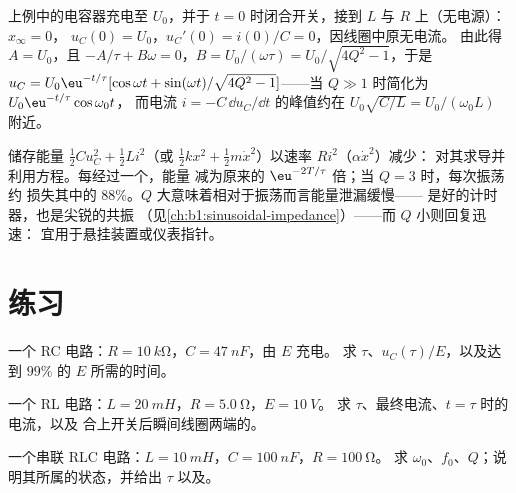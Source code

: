 \begin{example}[初始条件]\label{ex:b1:transient-regimes:ic}
上例中的电容器充电至 $U_0$，并于
$t = 0$ 时闭合开关，接到 $L$ 与 $R$ 上（无电源）：$x_\infty = 0$，
$u_C(0) = U_0$，$u_C'(0) = i(0)/C = 0$，因线圈中原无电流。
由此得 $A = U_0$，且 $-A/\tau + B\omega = 0$，$B = U_0/(\omega\tau) =
U_0/\sqrt{4Q^2 - 1}$，于是 $u_C = U_0\eu^{-t/\tau}[\cos\omega t + \sin(\omega
t)/\sqrt{4Q^2 - 1}]$——当 $Q \gg 1$ 时简化为 $U_0\eu^{-t/\tau}\cos\omega_0 t$，
而电流 $i = -C\,\dd u_C/\dd t$ 的峰值约在 $U_0\sqrt{C/L} =
U_0/(\omega_0 L)$ 附近。
\end{example}

\begin{remark}[能量]\label{rem:b1:transient-regimes:energy}
储存能量 $\tfrac12 Cu_C^2 + \tfrac12 Li^2$（或 $\tfrac12 kx^2
+ \tfrac12 m\dot x^2$）以速率 $Ri^2$（$\alpha\dot x^2$）减少：
对其求导并利用方程。每经过一个，能量
减为原来的 $\eu^{-2T/\tau}$ 倍；当 $Q = 3$ 时，每次振荡约
损失其中的 $88\%$。$Q$ 大意味着相对于振荡而言能量泄漏缓慢——
是好的计时器，也是尖锐的共振
（见\cref{ch:b1:sinusoidal-impedance}）——而 $Q$ 小则回复迅速：
宜用于悬挂装置或仪表指针。
\end{remark}

\section{练习}

\begin{exercise}[$\star$]\label{exo:b1:transient-regimes:1}
一个 RC 电路：$R = \qty{10}{k\ohm}$，$C = \qty{47}{nF}$，由 $E$ 充电。
求 $\tau$、$u_C(\tau)/E$，以及达到 $99\%$ 的 $E$ 所需的时间。
\end{exercise}

\begin{exercise}[$\star$]\label{exo:b1:transient-regimes:2}
一个 RL 电路：$L = \qty{20}{mH}$，$R = \qty{5.0}{\ohm}$，$E = \qty{10}{V}$。
求 $\tau$、最终电流、$t = \tau$ 时的电流，以及
合上开关后瞬间线圈两端的。
\end{exercise}

\begin{exercise}[$\star$]\label{exo:b1:transient-regimes:3}
一个串联 RLC 电路：$L = \qty{10}{mH}$，$C = \qty{100}{nF}$，$R = \qty{100}{\ohm}$。
求 $\omega_0$、$f_0$、$Q$；说明其所属的状态，并给出
$\tau$ 以及。
\end{exercise}


